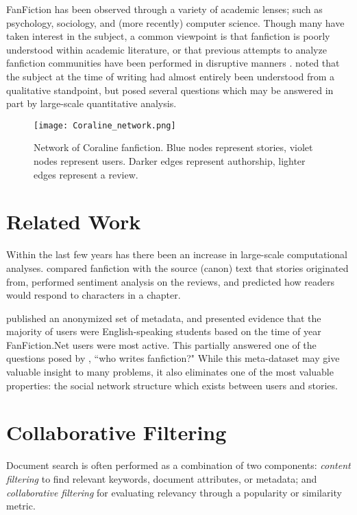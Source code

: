 \documentclass[letterpaper]{article}
\begin{document}
FanFiction has been observed through a variety of academic lenses; such as psychology, sociology, and (more recently) computer science. Though many have taken interest in the subject, a common viewpoint is that fanfiction is poorly understood within academic literature, or that previous attempts to analyze fanfiction communities have been performed in disruptive manners \cite{larsen2011fandom}. \cite{barnes2015fanfiction} noted that the subject at the time of writing had almost entirely been understood from a qualitative standpoint, but posed several questions which may be answered in part by large-scale quantitative analysis.

\begin{figure}
    \centering
    \texttt{[image: Coraline\_network.png]}
    \caption{Network of Coraline fanfiction. Blue nodes represent stories, violet nodes represent users. Darker edges represent authorship, lighter edges represent a review.}
    \label{fig:coraline_network}
\end{figure}

\section{Related Work}

Within the last few years has there been an increase in large-scale computational analyses. \cite{milli2016beyond} compared fanfiction with the source (canon) text that stories originated from, performed sentiment analysis on the reviews, and predicted how readers would respond to characters in a chapter.

\cite{yin2017no} published an anonymized set of metadata, and presented evidence that the majority of users were English-speaking students based on the time of year FanFiction.Net users were most active.  This partially answered one of the questions posed by \cite{barnes2015fanfiction}, ``who writes fanfiction?"  While this meta-dataset may give valuable insight to many problems, it also eliminates one of the most valuable properties: the social network structure which exists between users and stories.

\section{Collaborative Filtering}

Document search is often performed as a combination of two components: \textit{content filtering} to find relevant keywords, document attributes, or metadata; and \textit{collaborative filtering} for evaluating relevancy through a popularity or similarity metric.
\end{document}
